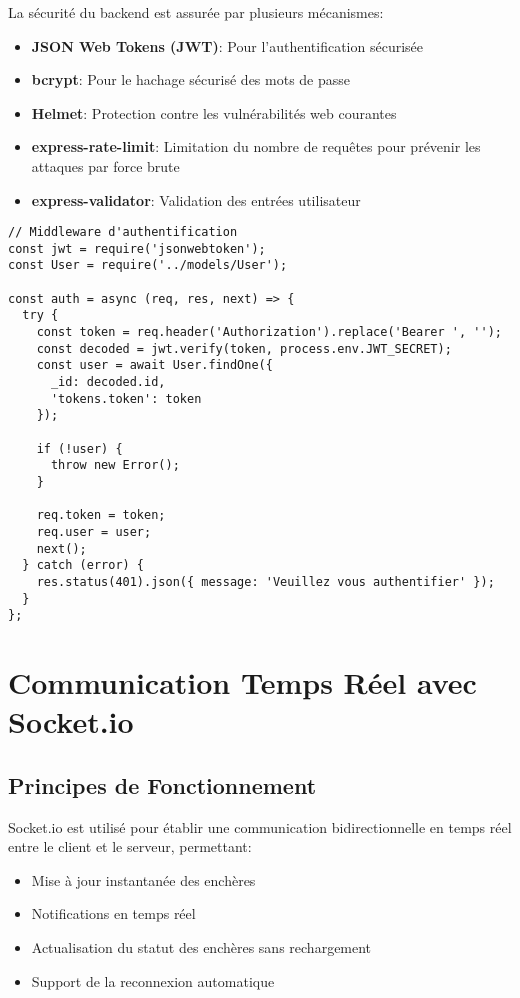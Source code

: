 La sécurité du backend est assurée par plusieurs mécanismes:

\begin{itemize}
    \item \textbf{JSON Web Tokens (JWT)}: Pour l'authentification sécurisée
    \item \textbf{bcrypt}: Pour le hachage sécurisé des mots de passe
    \item \textbf{Helmet}: Protection contre les vulnérabilités web courantes
    \item \textbf{express-rate-limit}: Limitation du nombre de requêtes pour prévenir les attaques par force brute
    \item \textbf{express-validator}: Validation des entrées utilisateur
\end{itemize}

\begin{verbatim}
// Middleware d'authentification
const jwt = require('jsonwebtoken');
const User = require('../models/User');

const auth = async (req, res, next) => {
  try {
    const token = req.header('Authorization').replace('Bearer ', '');
    const decoded = jwt.verify(token, process.env.JWT_SECRET);
    const user = await User.findOne({ 
      _id: decoded.id,
      'tokens.token': token 
    });
    
    if (!user) {
      throw new Error();
    }
    
    req.token = token;
    req.user = user;
    next();
  } catch (error) {
    res.status(401).json({ message: 'Veuillez vous authentifier' });
  }
};
\end{verbatim}

\section{Communication Temps Réel avec Socket.io}

\subsection{Principes de Fonctionnement}

Socket.io est utilisé pour établir une communication bidirectionnelle en temps réel entre le client et le serveur, permettant:

\begin{itemize}
    \item Mise à jour instantanée des enchères
    \item Notifications en temps réel
    \item Actualisation du statut des enchères sans rechargement
    \item Support de la reconnexion automatique
\end{itemize}

